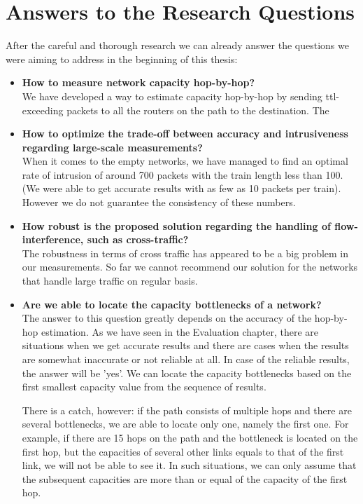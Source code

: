 \section{Answers to the Research Questions}
After the careful and thorough research we can already answer the questions we were aiming to address in the beginning of this thesis: \\
\begin{itemize}
  \item \textbf{How to measure network capacity hop-by-hop?}
  \\ We have developed a way to estimate capacity hop-by-hop by sending ttl-exceeding packets to all the routers on the path to the destination. The
  \item \textbf{How to optimize the trade-off between accuracy and intrusiveness regarding large-scale measurements?}
  \\When it comes to the empty networks, we have managed to find an optimal rate of intrusion of around 700 packets with the train length less than 100. (We were able to get accurate results with as few as 10 packets per train). However we do not guarantee the consistency of these numbers. 
  \item \textbf{How robust is the proposed solution regarding the handling of flow-interference, such as cross-traffic?}
  \\The robustness in terms of cross traffic has appeared to be a big problem in our measurements. So far we cannot recommend our solution for the networks that handle large traffic on regular basis.
  \item \textbf{Are we able to locate the capacity bottlenecks of a network?}
  \\ The answer to this question greatly depends on the accuracy of the hop-by-hop estimation. As we have seen in the Evaluation chapter, there are situations when we get accurate results and there are cases when the results are somewhat inaccurate or not reliable at all. In case of the reliable results, the answer will be 'yes'. We can locate the capacity bottlenecks based on the first smallest capacity value from the sequence of results. 
  
  There is a catch, however: if the path consists of multiple hops and there are several bottlenecks, we are able to locate only one, namely the first one. For example, if there are 15 hops on the path and the bottleneck is located on the first hop, but the capacities of several other links equals to that of the first link, we will not be able to see it. In such situations, we can only assume that the subsequent capacities are more than or equal of the capacity of the first hop.
\end{itemize}

